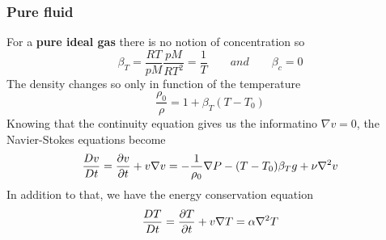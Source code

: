 		\subsubsection{Pure fluid}
			For a \textbf{pure ideal gas} there is no notion of concentration so 
			\begin{equation}
				\beta _T = \frac{RT}{pM} \frac{pM}{RT^2} = \frac{1}{T} \qquad and \qquad \beta _c = 0
			\end{equation}
			The density changes so only in function of the temperature 
			\begin{equation}
				\frac{\rho _0}{\rho} = 1 + \beta _T (T-T_0)
			\end{equation}
			Knowing that the continuity equation gives us the informatino $\nabla v = 0$, the Navier-Stokes equations become
			\begin{equation}
				\frac{Dv}{Dt} = \frac{\D v}{\D t} + v\nabla v = - \frac{1}{\rho _0} \nabla P - (T-T_0) \beta _T g + \nu \nabla ^2 v
				\label{eq:5.62}
			\end{equation}
			In addition to that, we have the energy conservation equation
			\begin{equation}
				\frac{DT}{Dt} = \frac{\D T}{\D t} + v \nabla T = \alpha \nabla ^2 T 
			\end{equation}
